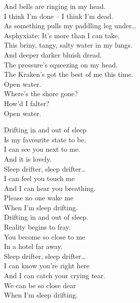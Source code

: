 And bells are ringing in my head. \\
I think I'm done -- I think I'm dead. \\
As something pulls my paddling leg under… \\

Asphyxiate: It's more than I can take. \\
This briny, tangy, salty water in my lungs. \\

And deeper darker bluish dread. \\
The pressure's squeezing on my head. \\
The Kraken's got the best of me this time. \\

Open water. \\
Where's the shore gone? \\
How'd I falter? \\
Open water. \\





Drifting in and out of sleep \\
Is my favourite state to be. \\
I can see you next to me. \\
And it is lovely. \\

Sleep drifter, sleep drifter… \\

I can feel you touch me \\
And I can hear you breathing. \\
Please no one wake me \\
When I'm sleep drifting. \\

Drifting in and out of sleep. \\
Reality begins to fray. \\
You become so close to me \\
In a hotel far away. \\

Sleep drifter, sleep drifter… \\

I can know you're right here \\
And I can catch your crying tear. \\
We can be so close dear \\
When I'm sleep drifting. \\

